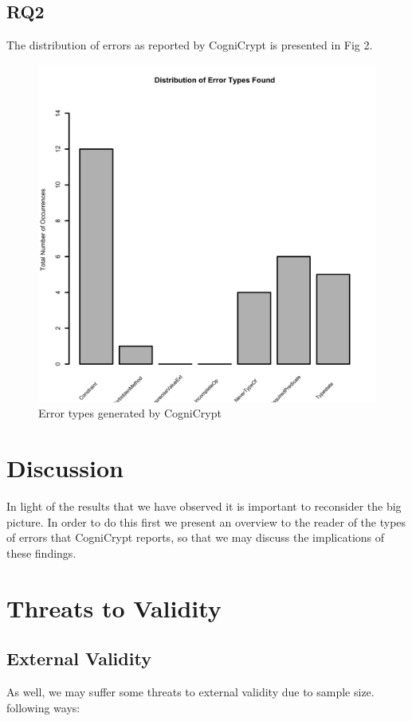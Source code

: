 \documentclass[10pt, conference]{IEEEtran}
\begin{document}
\subsection{RQ2}

The distribution of errors as reported by CogniCrypt is presented in Fig 2.

\begin{figure}[h]
\begin{center}
\includegraphics[width=0.9\linewidth]{Dist.png}
\caption{Error types generated by CogniCrypt}
\end{center}
\end{figure}

\section{Discussion}

In light of the results that we have observed it is important to reconsider the big picture. In order to do this first we present an overview to the reader of the types of errors that CogniCrypt reports, so that we may discuss the implications of these findings.

\section{Threats to Validity}

\subsection{External Validity}
As well, we may suffer some threats to external validity due to sample size.  following ways:
\end{document}
